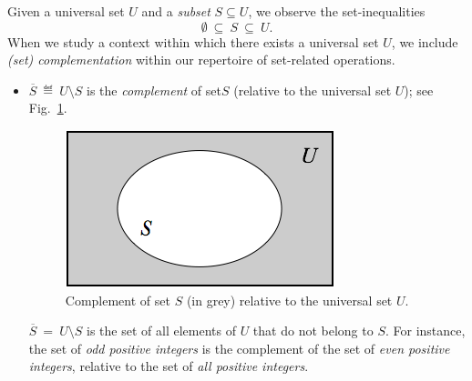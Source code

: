 \bigskip

\noindent {}
\bigskip

\noindent
Given a universal set $U$ and a {\em subset} $S \subseteq U$, we observe the set-inequalities
\[ \emptyset \ \subseteq \ S \ \subseteq \ U. \]
When we study a context within which there exists a universal set $U$, we include {\it (set) complementation} within our repertoire of set-related operations.
\begin{itemize}
\item
$\overline{S} \ \eqdef \ U \setminus S$ is the {\em complement} of set$S$ (relative to the universal set $U$); see Fig.~\ref{fig:setComplement}.
\begin{figure}[htb]
\begin{center}
        \includegraphics[scale=0.4]{FiguresMaths/setComplement}
        \caption{Complement of set $S$ (in grey) relative to the universal set $U$.}
        \label{fig:setComplement}
\end{center}
\end{figure}

\smallskip

$\overline{S} \ = \ U \setminus S$ is the set of all elements of $U$ that do not belong to $S$.  For instance, the set of {\em odd positive integers} is the complement of the set of {\em even positive integers}, relative to the set of {\em all positive integers}.
\end{itemize}

